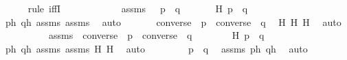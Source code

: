 \begin{isabellebody}
\ \ \ \ \isamarkupfalse%
\ {\isacharparenleft}{\kern0pt}rule\ iffI{\isacharparenright}{\kern0pt}\ \isanewline
\ \ \isamarkupfalse%
\ {\isacharminus}{\kern0pt}\ \isanewline
\ \ \ \ \isamarkupfalse%
\ assms{\isacharprime}{\kern0pt}\ {\isacharcolon}{\kern0pt}\ {\isachardoublequoteopen}\ p\ {\isasympreceq}\ q{\isachardoublequoteclose}\ \isanewline
\ \ \ \ \isamarkupfalse%
\ H{}{\isacharcolon}{\kern0pt}\ {\isachardoublequoteopen}p{\isacharprime}{\kern0pt}\ {\isasympreceq}\ q{\isacharprime}{\kern0pt}{\isachardoublequoteclose}\ \isamarkupfalse%
\ p{\isacharprime}{\kern0pt}h\ q{\isacharprime}{\kern0pt}h\ assms\ assms{\isacharprime}{\kern0pt}\ \isamarkupfalse%
\ auto\isanewline
\ \ \ \ \isamarkupfalse%
\ {\isachardoublequoteopen}\ converse{\isacharparenleft}{\kern0pt}{\isasympi}{\isacharparenright}{\kern0pt}\ {\isacharbackquote}{\kern0pt}\ p\ {\isasympreceq}\ converse{\isacharparenleft}{\kern0pt}{\isasympi}{\isacharparenright}{\kern0pt}\ {\isacharbackquote}{\kern0pt}\ q{\isachardoublequoteclose}\ \isamarkupfalse%
\ H{}\ H{}\ H{}\ \isamarkupfalse%
\ auto\ \isanewline
\ \ \isamarkupfalse%
\ \isanewline
\ \ \ \ \isamarkupfalse%
\ assms{\isacharprime}{\kern0pt}\ {\isacharcolon}{\kern0pt}\ {\isachardoublequoteopen}converse{\isacharparenleft}{\kern0pt}{\isasympi}{\isacharparenright}{\kern0pt}\ {\isacharbackquote}{\kern0pt}\ p\ {\isasympreceq}\ converse{\isacharparenleft}{\kern0pt}{\isasympi}{\isacharparenright}{\kern0pt}\ {\isacharbackquote}{\kern0pt}\ q\ {\isachardoublequoteclose}\ \isanewline
\ \ \ \ \isamarkupfalse%
\ H{}{\isacharcolon}{\kern0pt}\ {\isachardoublequoteopen}p{\isacharprime}{\kern0pt}\ {\isasympreceq}\ q{\isacharprime}{\kern0pt}{\isachardoublequoteclose}\ \isamarkupfalse%
\ p{\isacharprime}{\kern0pt}h\ q{\isacharprime}{\kern0pt}h\ assms\ assms{\isacharprime}{\kern0pt}\ H{}\ H{}\ \isamarkupfalse%
\ auto\ \isanewline
\ \ \ \ \isamarkupfalse%
\ \isamarkupfalse%
\ {\isachardoublequoteopen}p\ {\isasympreceq}\ q{\isachardoublequoteclose}\ \isamarkupfalse%
\ assms\ p{\isacharprime}{\kern0pt}h\ q{\isacharprime}{\kern0pt}h\ \isamarkupfalse%
\ auto\ \isanewline
\ \ \isamarkupfalse%
\isanewline
{}\isamarkupfalse%
%
\endisatagproof
{\isafoldproof}%
%

\end{isabellebody}

